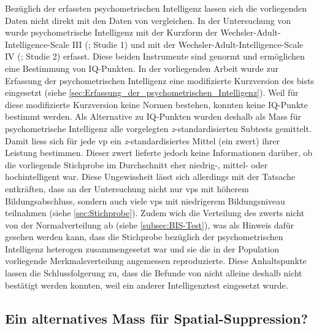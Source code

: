 \documentclass[11pt, twoside, a4paper]{book}		%
\begin{document}
Bezüglich der erfassten psychometrischen Intelligenz lassen sich die vorliegenden Daten nicht direkt mit den Daten von \citet{Melnick2013} vergleichen. In der Untersuchung von \citeauthor{Melnick2013} wurde psychometrische Intelligenz mit der Kurzform der Wechsler-Adult-Intelligence-Scale III (\citealp{Axelrod2002}; Studie 1) und mit der Wechsler-Adult-In\-tell\-igence-Scale IV (\citealp{Wechsler2008}; Studie 2) erfasst. Diese beiden Instrumente sind genormt und ermöglichen eine Bestimmung von IQ-Punkten. In der vorliegenden Arbeit wurde zur Erfassung der psychometrischen Intelligenz eine modifizierte Kurzversion des \gls{bist}s eingesetzt (siehe \autoref{sec:Erfassung_der_psychometrischen_Intelligenz}). Weil für diese modifizierte Kurzversion keine Normen bestehen, konnten keine IQ-Punkte bestimmt werden. Als Alternative zu IQ-Punkten wurden deshalb als Mass für psychometrische Intelligenz alle vorgelegten \textit{z}-standardisierten Subtests gemittelt. Damit liess sich für jede \gls{vp} ein \textit{z}-standardisiertes Mittel (ein \gls{zwert}) ihrer Leistung bestimmen. Dieser \gls{zwert} lieferte jedoch keine Informationen darüber, ob die vorliegende Stichprobe im Durchschnitt eher niedrig-, mittel- oder hochintelligent war. Diese Ungewissheit lässt sich allerdings mit der Tatsache entkräften, dass an der Untersuchung nicht nur \glspl{vp} mit höherem Bildungsabschluss, sondern auch viele \glspl{vp} mit niedrigerem Bildungsniveau teilnahmen (siehe \autoref{sec:Stichprobe}). 
Zudem wich die Verteilung des \gls{zwert}s nicht von der Normalverteilung ab (siehe \autoref{subsec:BIS-Test}), was als Hinweis dafür gesehen werden kann, dass die Stichprobe bezüglich der psychometrischen Intelligenz heterogen zusammengesetzt war und sie die in der Population vorliegende Merkmalsverteilung angemessen reproduzierte. Diese Anhaltspunkte lassen die Schlussfolgerung zu, dass die Befunde von \citeauthor{Melnick2013} nicht alleine deshalb nicht bestätigt werden konnten, weil ein anderer Intelligenztest eingesetzt wurde.

\subsection{Ein alternatives Mass für Spatial-Suppression? \label{subsec:Ein_alternatives_Mass_für_SS?}}
\end{document}
